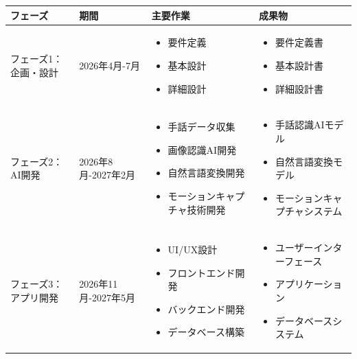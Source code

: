 \documentclass[12pt,a4paper]{jsarticle}
\begin{document}
\begin{longtable}{|p{3cm}|p{2.5cm}|p{6cm}|p{3cm}|}
\hline
\textbf{フェーズ} & \textbf{期間} & \textbf{主要作業} & \textbf{成果物} \\
\hline
\endhead

フェーズ1：企画・設計 & 2026年4月-7月 & 
\begin{itemize}
\item 要件定義
\item 基本設計
\item 詳細設計
\end{itemize} & 
\begin{itemize}
\item 要件定義書
\item 基本設計書
\item 詳細設計書
\end{itemize} \\
\hline

フェーズ2：AI開発 & 2026年8月-2027年2月 & 
\begin{itemize}
\item 手話データ収集
\item 画像認識AI開発
\item 自然言語変換開発
\item モーションキャプチャ技術開発
\end{itemize} & 
\begin{itemize}
\item 手話認識AIモデル
\item 自然言語変換モデル
\item モーションキャプチャシステム
\end{itemize} \\
\hline

フェーズ3：アプリ開発 & 2026年11月-2027年5月 & 
\begin{itemize}
\item UI/UX設計
\item フロントエンド開発
\item バックエンド開発
\item データベース構築
\end{itemize} & 
\begin{itemize}
\item ユーザーインターフェース
\item アプリケーション
\item データベースシステム
\end{itemize} \\
\hline


\end{longtable}
\end{document}
